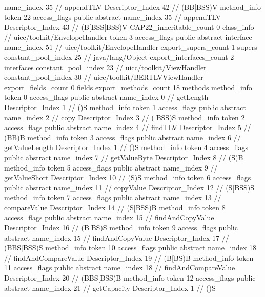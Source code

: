 {{{{{					name_index	35		// appendTLV
					Descriptor_Index	42		// (BB[BSS)V
				}
				method_info {
					token	22
					access_flags	public abstract
					name_index	35		// appendTLV
					Descriptor_Index	43		// (B[BSS[BSS)V
				}
			}
			CAP22_inheritable_count	0
		}
		class_info {		// uicc/toolkit/EnvelopeHandler
			token	3
			access_flags	public abstract interface
			name_index	51		// uicc/toolkit/EnvelopeHandler
			export_supers_count	1
			supers {
				constant_pool_index	25		// java/lang/Object
			}
			export_interfaces_count	2
			interfaces {
				constant_pool_index	23		// uicc/toolkit/ViewHandler
				constant_pool_index	30		// uicc/toolkit/BERTLVViewHandler
			}
			export_fields_count	0
			fields {
			}
			export_methods_count	18
			methods {
				method_info {
					token	0
					access_flags	public abstract
					name_index	0		// getLength
					Descriptor_Index	1		// ()S
				}
				method_info {
					token	1
					access_flags	public abstract
					name_index	2		// copy
					Descriptor_Index	3		// ([BSS)S
				}
				method_info {
					token	2
					access_flags	public abstract
					name_index	4		// findTLV
					Descriptor_Index	5		// (BB)B
				}
				method_info {
					token	3
					access_flags	public abstract
					name_index	6		// getValueLength
					Descriptor_Index	1		// ()S
				}
				method_info {
					token	4
					access_flags	public abstract
					name_index	7		// getValueByte
					Descriptor_Index	8		// (S)B
				}
				method_info {
					token	5
					access_flags	public abstract
					name_index	9		// getValueShort
					Descriptor_Index	10		// (S)S
				}
				method_info {
					token	6
					access_flags	public abstract
					name_index	11		// copyValue
					Descriptor_Index	12		// (S[BSS)S
				}
				method_info {
					token	7
					access_flags	public abstract
					name_index	13		// compareValue
					Descriptor_Index	14		// (S[BSS)B
				}
				method_info {
					token	8
					access_flags	public abstract
					name_index	15		// findAndCopyValue
					Descriptor_Index	16		// (B[BS)S
				}
				method_info {
					token	9
					access_flags	public abstract
					name_index	15		// findAndCopyValue
					Descriptor_Index	17		// (BBS[BSS)S
				}
				method_info {
					token	10
					access_flags	public abstract
					name_index	18		// findAndCompareValue
					Descriptor_Index	19		// (B[BS)B
				}
				method_info {
					token	11
					access_flags	public abstract
					name_index	18		// findAndCompareValue
					Descriptor_Index	20		// (BBS[BSS)B
				}
				method_info {
					token	12
					access_flags	public abstract
					name_index	21		// getCapacity
					Descriptor_Index	1		// ()S
}}}}}
